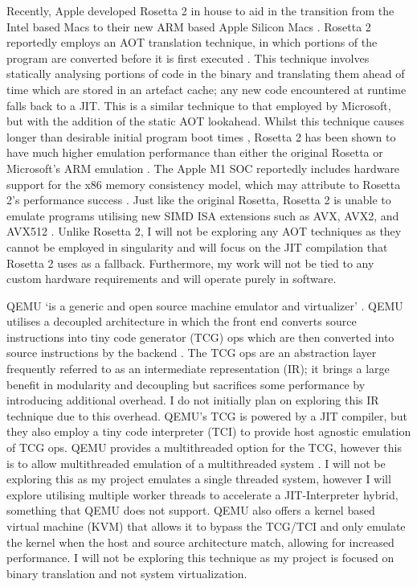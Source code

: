 Recently, Apple developed Rosetta 2 \cite{rosetta2} in house to aid in the transition from the Intel based Macs to their new ARM based Apple Silicon Macs \cite{rosetta2, apple-silicon}. Rosetta 2 reportedly employs an AOT translation technique, in which portions of the program are converted before it is first executed \cite{rosetta2-aot, ars-technica-big-sur}. This technique involves statically analysing portions of code in the binary and translating them ahead of time which are stored in an artefact cache; any new code encountered at runtime falls back to a JIT. This is a similar technique to that employed by Microsoft, but with the addition of the static AOT lookahead. Whilst this technique causes longer than desirable initial program boot times \cite{rosetta2-slow-launch}, Rosetta 2 has been shown to have much higher emulation performance than either the original Rosetta or Microsoft's ARM emulation \cite{rosetta2-perf}. The Apple M1 SOC reportedly includes hardware support for the x86 memory consistency model, which may attribute to Rosetta 2's performance success \cite{rosetta2-infoq}. Just like the original Rosetta, Rosetta 2 is unable to emulate programs utilising new SIMD ISA extensions such as AVX, AVX2, and AVX512 \cite{rosetta2}. Unlike Rosetta 2, I will not be exploring any AOT techniques as they cannot be employed in singularity and will focus on the JIT compilation that Rosetta 2 uses as a fallback. Furthermore, my work will not be tied to any custom hardware requirements and will operate purely in software.

QEMU `is a generic and open source machine emulator and virtualizer' \cite{qemu}. QEMU utilises a decoupled architecture in which the front end converts source instructions into tiny code generator (TCG) ops which are then converted into source instructions by the backend \cite{qemu-tcg}. The TCG ops are an abstraction layer frequently referred to as an intermediate representation (IR); it brings a large benefit in modularity and decoupling but sacrifices some performance by introducing additional overhead. I do not initially plan on exploring this IR technique due to this overhead. QEMU's TCG is powered by a JIT compiler, but they also employ a tiny code interpreter (TCI) to provide host agnostic emulation of TCG ops. QEMU provides a multithreaded option for the TCG, however this is to allow multithreaded emulation of a multithreaded system \cite{qemu-tcg-multithreading}. I will not be exploring this as my project emulates a single threaded system, however I will explore utilising multiple worker threads to accelerate a JIT-Interpreter hybrid, something that QEMU does not support. QEMU also offers a kernel based virtual machine (KVM) that allows it to bypass the TCG/TCI and only emulate the kernel when the host and source architecture match, allowing for increased performance. I will not be exploring this technique as my project is focused on binary translation and not system virtualization. 